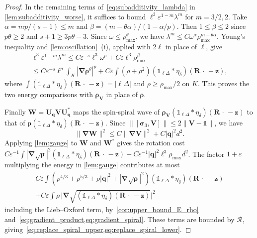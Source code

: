 \documentclass[final,reqno]{amsart}
\theoremstyle{remark}
\renewcommand{\le}{\leqslant}
\renewcommand{\ge}{\geqslant}
\renewcommand{\epsilon}{\varepsilon}
\newcommand{\iden}{\mathbb{1}}
\newcommand{\grad}{\bm{\nabla}}
\newcommand{\tetra}{\mathbb{\Delta}}
\begin{document}
\begin{proof}
In the remaining terms of~\cref{eq:subadditivity_lambda} in \cref{lem:subadditivity_worse}, it suffices to bound $\ell^3\epsilon^{1-m}\lambda^m$ for $m=3/2,2$. Take $\alpha=mp/(s+1)\le m$ and $\beta=(m-\theta\alpha)/(1-\alpha/p)$. Then $1\le\beta\le2$ since $p\theta\ge2$ and $s+1\ge3p\theta-3$. Since $\omega\le \rho_{\max}^\theta$, we have $\lambda^m\le C\omega^\alpha \rho_{\max}^{m-\theta\alpha}$. Young's inequality and \cref{lem:oscillation}~(i), applied with $2\ell$ in place of $\ell$, give
\begin{multline*}
 \ell^3\epsilon^{1-m}\lambda^m
 \le C\epsilon^{-s}\ell^3\omega^p+C\epsilon\ell^3\rho_{\max}^\beta\\
 \le C\epsilon^{-s}\ell^p\int_K|\grad\bm{\rho}^\theta|^p+C\epsilon\int(\rho+\rho^2)(\iden_{\ell\tetra}\ast\eta_\delta)(\mathbf{R}\,\cdot\,-\mathbf{z}) ,
\end{multline*}
where $\int(\iden_{\ell\tetra}\ast\eta_\delta)(\mathbf{R}\,\cdot\,-\mathbf{z})=|\ell\tetra|$ and $\rho\ge \rho_{\max}/2$ on $K$. This proves the two energy comparisons with $\bm{\rho}_{\mathbf{V}}$ in place of $\bm{\rho}$.

Finally $\mathbf{W}=\mathbf{U}_{\mathbf{q}}\mathbf{V}\mathbf{U}_{\mathbf{q}}^*$ maps the spin-spiral wave of $\bm{\rho}_{\mathbf{V}}(\iden_{\ell\tetra}\ast\eta_\delta)(\mathbf{R}\,\cdot\,-\mathbf{z})$ to that of $\bm{\rho}(\iden_{\ell\tetra}\ast\eta_\delta)(\mathbf{R}\,\cdot\,-\mathbf{z})$. Since $\|[\bm{\sigma}_3,\mathbf{V}]\|\le2\|\mathbf{V}-\iden\|$, we have
\[
 \|\grad\mathbf{W}\|^2\le C\|\grad\mathbf{V}\|^2+C|\mathbf{q}|^2 d^2 .
\]
Applying \cref{lem:gauge} to $\mathbf{W}$ and $\mathbf{W}^*$ gives the rotation cost $C\epsilon^{-1}\int |\grad\sqrt{\bm{\rho}}|^2(\iden_{\ell\tetra}\ast\eta_\delta)(\mathbf{R}\,\cdot\,-\mathbf{z})+C\epsilon^{-1}|\mathbf{q}|^2\ell^3\rho_{\max} d^2$. The factor $1+\epsilon$ multiplying the energy in \cref{lem:gauge} contributes at most
\begin{multline*}
 C\epsilon\int(\rho^{4/3}+\rho^{5/3}+\rho|\mathbf{q}|^2+|\grad\sqrt{\bm{\rho}}|^2)(\iden_{\ell\tetra}\ast\eta_\delta)(\mathbf{R}\,\cdot\,-\mathbf{z})\\
 +C\epsilon\int\rho\,\Big|\grad\sqrt{(\iden_{\ell\tetra}\ast\eta_\delta)(\mathbf{R}\,\cdot\,-\mathbf{z})}\Big|^2
\end{multline*}
including the Lieb--Oxford term, by~\cref{cor:upper_bound_E_rho} and~\cref{eq:gradient_product,eq:gradient_spiral}. These terms are bounded by $\mathcal{R}$, giving~\cref{eq:replace_spiral_upper,eq:replace_spiral_lower}.
\end{proof}
\end{document}

